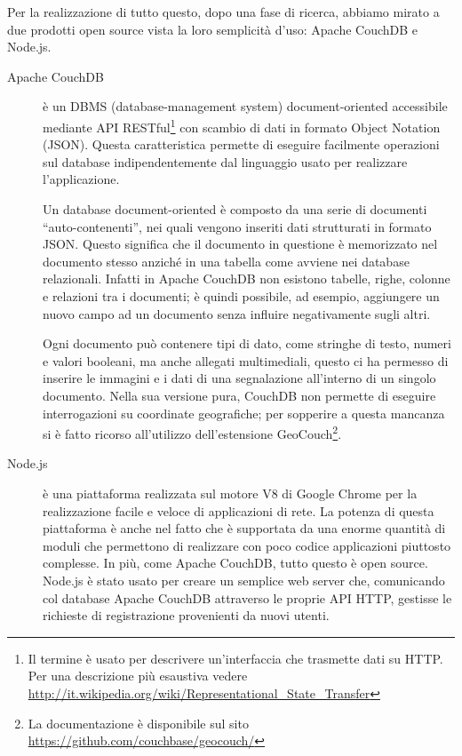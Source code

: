 		Per la realizzazione di tutto questo, dopo una fase di ricerca, abbiamo
		mirato a due prodotti open source vista la loro semplicità d'uso:
		Apache CouchDB\texttrademark{} e Node.js.
		\begin{description}
			\item[Apache CouchDB\texttrademark{}] è un DBMS (database-management
				system) document-o\-rien\-ted accessibile mediante API RESTful\footnote{Il termine è usato
				per descrivere un'interfaccia che trasmette dati su HTTP. Per una
				descrizione più esaustiva vedere
				\url{http://it.wikipedia.org/wiki/Representational_State_Transfer}}
				con scambio di dati in formato \js{} Object Notation (JSON). Questa
				caratteristica permette di eseguire facilmente operazioni sul database
				indipendentemente dal linguaggio usato per realizzare l'applicazione.
				
				Un database document-oriented è composto da una serie di documenti
				``auto-contenenti'', nei quali vengono inseriti dati strutturati
				in formato JSON. Questo significa che il documento in
				questione è memorizzato nel documento stesso anziché in una tabella
				come avviene nei database relazionali. Infatti in Apache CouchDB\texttrademark{}
				non esistono tabelle, righe, colonne e relazioni tra i
				documenti; è quindi possibile, ad esempio, aggiungere un nuovo
				campo ad un documento senza influire negativamente sugli altri.
				
				Ogni documento può contenere tipi di dato, come stringhe 
				di testo, numeri e valori booleani, ma anche allegati multimediali, 
				questo ci ha permesso di inserire le immagini e i dati di una 
				segnalazione all'interno di un singolo documento.
				Nella sua versione pura, CouchDB non permette di eseguire interrogazioni 
				su coordinate geografiche; per sopperire a questa mancanza si è fatto
				ricorso all'utilizzo dell'estensione GeoCouch\footnote{La documentazione 
				è disponibile sul sito \url{https://github.com/couchbase/geocouch/}}.
			\item[Node.js] è una piattaforma realizzata sul motore \js{} V8 di
				Google Chrome per la realizzazione facile e veloce di
				applicazioni di rete. La potenza di questa piattaforma è anche
				nel fatto che è supportata da una enorme quantità di moduli
				che permettono di realizzare con poco codice applicazioni piuttosto
				complesse. In più, come Apache CouchDB\texttrademark{}, tutto 
				questo è open source. Node.js è stato usato per creare un
				semplice web server che, comunicando col database Apache CouchDB\texttrademark{}
				attraverso le proprie API HTTP, gestisse le richieste di
				registrazione provenienti da nuovi utenti.
		\end{description}
		
